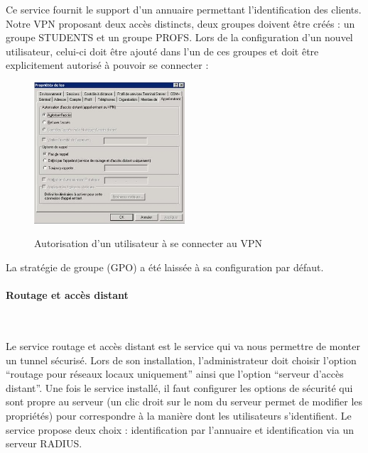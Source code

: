 Ce service fournit le support d'un annuaire permettant l'identification des clients. Notre VPN proposant deux accès distincts, deux groupes doivent être créés : un groupe STUDENTS et un groupe PROFS. Lors de la configuration d'un nouvel utilisateur, celui-ci doit être ajouté dans l'un de ces groupes et doit être explicitement autorisé à pouvoir se connecter :

\begin{figure}[H]
	\begin{center}
		\includegraphics[width=0.50\textwidth]{partie_2/screen_windows/vpn.JPG}\\
	\end{center}
	\caption{Autorisation d'un utilisateur à se connecter au VPN}
	\label{VPN_AUTORISATION}
\end{figure}

La stratégie de groupe (GPO) a été laissée à sa configuration par défaut.


\paragraph{Routage et accès distant}
~\

Le service routage et accès distant est le service qui va nous permettre de monter un tunnel sécurisé. Lors de son installation, l'administrateur doit choisir l'option ``routage pour réseaux locaux uniquement'' ainsi que l'option ``serveur d'accès distant''. Une fois le service installé, il faut configurer les options de sécurité qui sont propre au serveur (un clic droit sur le nom du serveur permet de modifier les propriétés) pour correspondre à la manière dont les utilisateurs s'identifient. Le service propose deux choix : identification par l'annuaire et identification via un serveur RADIUS.

